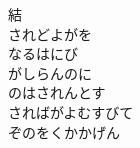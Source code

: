 \documentclass[10pt,b5j]{tarticle} %
\begin{document}
\begin{enumerate}
\begin{minipage}[c]{\blocksize}
        \vspace{\linespace}
        \item[結]~\\
        されどよがを\\
        なるはにび\\
        がしらんのに\\
        のはされんとす\\
        さればがよむすびて\\
        ぞのをくかかげん
    
    \end{minipage}
\end{enumerate} %
\end{document}
